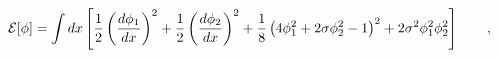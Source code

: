 \begin{equation}
{\cal E}[\phi]=\int dx \left[ \frac{1}{2} \left(\frac{d \phi_1}{d
x}\right)^2 + \frac{1}{2} \left(\frac{d \phi_2}{d x}\right)^2 +
\frac{1}{8} \left( 4 \phi_1^2+ 2 \sigma \phi_2^2-1 \right)^2 + 2
\sigma^2 \phi_1^2 \phi_2^2 \right] \qquad , \label{eq:adimener}
\end{equation}

